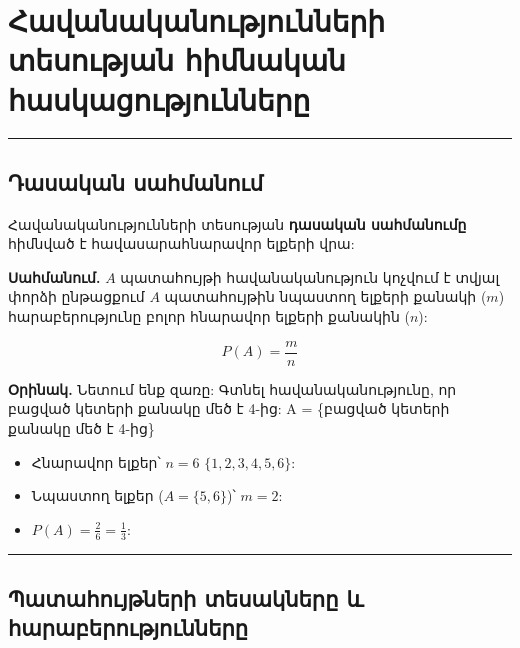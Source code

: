 \documentclass[12pt, a4paper]{article}
\begin{document}
\section{Հավանականությունների տեսության հիմնական հասկացությունները}

\tableofcontents

\vspace{2em}
\hrule
\vspace{2em}

\subsection{Դասական սահմանում}

Հավանականությունների տեսության \textbf{դասական սահմանումը} հիմնված է հավասարահնարավոր ելքերի վրա:

\textbf{Սահմանում.} $A$ պատահույթի հավանականություն կոչվում է տվյալ փորձի ընթացքում $A$ պատահույթին նպաստող ելքերի քանակի ($m$) հարաբերությունը բոլոր հնարավոր ելքերի քանակին ($n$):

$$P(A) = \frac{m}{n}$$

\textbf{Օրինակ.} Նետում ենք զառը: Գտնել հավանականությունը, որ բացված կետերի քանակը մեծ է 4-ից: A = \{բացված կետերի քանակը մեծ է 4-ից\}

\begin{itemize}
    \item Հնարավոր ելքեր՝ $n = 6$ $\{1, 2, 3, 4, 5, 6\}$:
    \item Նպաստող ելքեր ($A = \{5, 6\}$)՝ $m = 2$:
    \item $P(A) = \frac{2}{6} = \frac{1}{3}$:
\end{itemize}

\vspace{1em}
\hrule
\vspace{1em}

\subsection{Պատահույթների տեսակները և հարաբերությունները}
\end{document}
